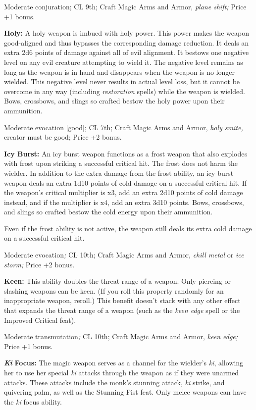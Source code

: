 \documentclass{article}
\begin{document}
Moderate conjuration; CL 9th; Craft Magic Arms and Armor, \textit{plane shift; 
}Price +1 bonus.

\textbf{Holy:} A holy weapon is imbued with holy power. This power makes the weapon 
good-aligned and thus bypasses the corresponding damage reduction. It deals an 
extra 2d6 points of damage against all of evil alignment. It bestows one negative 
level on any evil creature attempting to wield it. The negative level remains as 
long as the weapon is in hand and disappears when the weapon is no longer wielded. 
This negative level never results in actual level loss, but it cannot be overcome 
in any way (including \textit{restoration }spells) while the weapon is wielded. 
Bows, crossbows, and slings so crafted bestow the holy power upon their ammunition.

Moderate evocation [good]; CL 7th; Craft Magic Arms and Armor, \textit{holy smite, 
}creator must be good; Price +2 bonus.

\textbf{Icy Burst:} An icy burst weapon functions as a frost weapon that also explodes 
with frost upon striking a successful critical hit. The frost does not harm the 
wielder. In addition to the extra damage from the frost ability, an icy burst weapon 
deals an extra 1d10 points of cold damage on a successful critical hit. If the 
weapon's critical multiplier is x3, add an extra 2d10 points of cold damage instead, 
and if the multiplier is x4, add an extra 3d10 points. Bows, crossbows, and slings 
so crafted bestow the cold energy upon their ammunition. 

Even if the frost ability is not active, the weapon still deals its extra cold 
damage on a successful critical hit.

Moderate evocation\textit{; }CL 10th; Craft Magic Arms and Armor, \textit{chill 
metal }or \textit{ice storm; }Price +2 bonus.

\textbf{Keen:} This ability doubles the threat range of a weapon. Only piercing 
or slashing weapons can be keen. (If you roll this property randomly for an inappropriate 
weapon, reroll.) This benefit doesn't stack with any other effect that expands 
the threat range of a weapon (such as the \textit{keen edge }spell or the Improved 
Critical feat).

Moderate transmutation\textit{; }CL 10th; Craft Magic Arms and Armor, \textit{keen 
edge; }Price +1 bonus.

\textit{\textbf{Ki }}\textbf{Focus:} The magic weapon serves as a channel for the 
wielder's \textit{ki}, allowing her to use her special \textit{ki }attacks through 
the weapon as if they were unarmed attacks. These attacks include the monk's stunning 
attack, \textit{ki }strike, and quivering palm, as well as the Stunning Fist feat. 
Only melee weapons can have the \textit{ki }focus ability.
\end{document}
